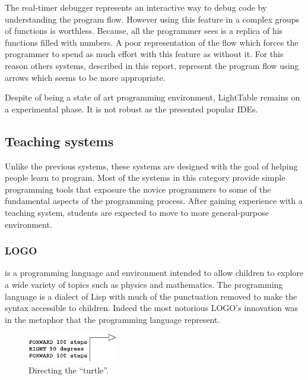 The real-timer debugger represents an interactive way to debug code by understanding the program flow. However using this feature in a complex groups of functions is worthless. Because, all the programmer sees is a replica of his functions filled with numbers. A poor representation of the flow which forces the programmer to spend as much effort with this feature as without it. For this reason others systems, described in this report, represent the program flow using arrows which seems to be more appropriate.

Despite of being a state of art programming environment, LightTable remains on a experimental phase. It is not robust as the presented popular IDEs.
\subsection{Teaching systems}

Unlike the previous systems, these systems are designed with the goal of helping people learn to program. Most of the systems in this category provide simple programming tools that exposure the novice programmers to some of the fundamental aspects of the programming process. After gaining experience with a teaching system, students are expected to move to more general-purpose environment. 

\subsubsection{LOGO~\cite{papert1980mindstorms}} is a programming language and environment intended to allow children to explore a wide variety of topics such as physics and mathematics. The programming language is a dialect of Lisp with much of the punctuation removed to make the syntax accessible to children. Indeed the most notorious LOGO's innovation was in the metaphor that the programming language represent.

\begin{figure}
  \vspace{-25pt}
  \begin{center}
    \includegraphics[width=0.35\textwidth]{img/turtle}
  \end{center}
  \vspace{-20pt}
 \caption{Directing the ``turtle''.}  
  \vspace{-20pt}
    \label{fig:turtle}
\end{figure}

